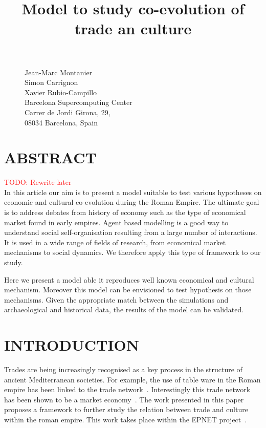 \documentclass{wscpaperproc}
\newcommand{\memo}[2]{\textcolor{#1}{#2}}
\newcommand{\todo}[1]{\memo{red}{TODO: #1\\}}
\begin{document}

\title{Model to study co-evolution of trade an culture}
\maketitle

\begin{figure}[htb]
{
\centering
Jean-Marc Montanier\\
Simon Carrignon\\ 
Xavier Rubio-Campillo\\
\vspace{12pt}
Barcelona Supercomputing Center\\
Carrer de Jordi Girona, 29, \\
08034 Barcelona, Spain\\
}
\end{figure}







\section*{ABSTRACT}

\todo{Rewrite later}
In this article our aim is to present a model suitable to test various hypotheses on economic and cultural co-evolution during the Roman Empire. The ultimate goal is to address debates from history of economy such as the type of economical market found in early empires. Agent based modelling is a good way to understand social self-organisation resulting from a large number of interactions. It is used in a wide range of fields of research, from economical market mechanisms to social dynamics. We therefore apply this type of framework to our study.

Here we present a model able it reproduces well known economical and cultural mechanism. Moreover this model can be envisioned to test hypothesis on those mechanisms. Given the appropriate match between the simulations and archaeological and historical data, the results of the model can be validated.


\section{INTRODUCTION}

Trades are being increasingly recognised as a key process in the structure of ancient Mediterranean societies. For example, the use of table ware in the Roman empire  has been linked to the trade network~\cite{brughmans_connecting_2010}. Interestingly this trade network has been shown to be a market economy~\cite{temin_market_2001}. The work presented in this paper proposes a framework to further study the relation between trade and culture within the roman empire. This work takes place within the EPNET project~\cite{remesal_epnet_2014}.
\end{document}
